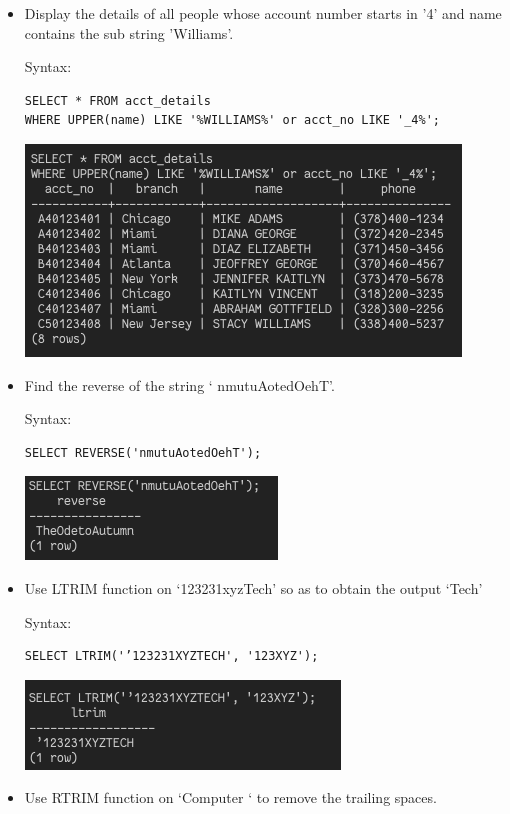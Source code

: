 \documentclass[13pt,oneside]{book}
\begin{document}
\begin{itemize}
\item
Display the details of all people whose account number starts in '4’ and name
 contains the sub string 'Williams’.

Syntax:
\begin{verbatim}
SELECT * FROM acct_details
WHERE UPPER(name) LIKE '%WILLIAMS%' or acct_no LIKE '_4%';
\end{verbatim}
\includegraphics[]{img/p6/ss12.png}

\item
Find the reverse of the string ‘ nmutuAotedOehT’.
 
Syntax:
\begin{verbatim}
SELECT REVERSE('nmutuAotedOehT');

\end{verbatim}
\includegraphics[]{img/p6/ss13.png}


\item
Use LTRIM function on ‘123231xyzTech’ so as to obtain the output ‘Tech’
 
Syntax:
\begin{verbatim}
SELECT LTRIM('’123231XYZTECH', '123XYZ');

\end{verbatim}
\includegraphics[]{img/p6/ss14.png}


\item
Use RTRIM function on ‘Computer ‘ to remove the trailing spaces.
 

\end{itemize}
\end{document}
